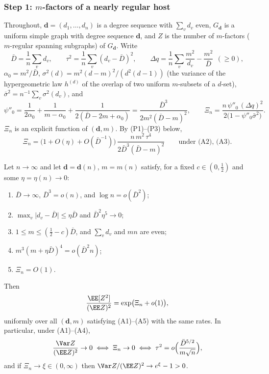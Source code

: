 
\subsubsection*{Step 1: \(m\)-factors of a nearly regular host}

Throughout, \(\mathbf d=(d_1,\dots,d_n)\) is a degree sequence with
\(\sum_vd_v\) even, \(G_{\mathbf d}\) is a uniform simple graph with degree
sequence \(\mathbf d\), and \(Z\) is the number of \(m\)-factors
(\(m\)-regular spanning subgraphs) of \(G_{\mathbf d}\). Write
\[
\bar D=\frac1n\sum_vd_v,\qquad
\tau^2=\frac1n\sum_v(d_v-\bar D)^2,\qquad
\Delta q=\frac1n\sum_v\frac{m^2}{d_v}-\frac{m^2}{\bar D}\ \ (\ge0),
\]
\(\alpha_0=m^2/\bar D\), \(\sigma^2(d)=m^2(d-m)^2/(d^2(d-1))\) (the variance of
the hypergeometric law \(h^{(d)}\) of the overlap of two uniform \(m\)-subsets of
a \(d\)-set), \(\bar\sigma^2=n^{-1}\sum_v\sigma^2(d_v)\), and
\[
\psi''_0=\frac1{2\alpha_0}+\frac1{m-\alpha_0}+\frac1{2(\bar D-2m+\alpha_0)}
=\frac{\bar D^3}{2m^2(\bar D-m)^2},
\qquad
\Xi_n=\frac{n\,\psi''_0\,(\Delta q)^2}{2\bigl(1-\psi''_0\bar\sigma^2\bigr)} .
\]
\(\Xi_n\) is an explicit function of \((\mathbf d,m)\). By (P1)--(P3) below,
\[
\Xi_n=\bigl(1+O(\eta)+O(\bar D^{-1})\bigr)\,
\frac{n\,m^2\,\tau^4}{2\bar D^3(\bar D-m)^2}
\qquad\text{under (A2), (A3).}
\tag{S1.1}
\]

\begin{lemma}
\label{lem:near-regular-host}
Let \(n\to\infty\) and let \(\mathbf d=\mathbf d(n)\), \(m=m(n)\) satisfy, for a fixed
\(c\in(0,\tfrac12)\) and some \(\eta=\eta(n)\to0\):
\begin{enumerate}
\item[(A1)] \(\bar D\to\infty\), \(\bar D^3=o(n)\), and \(\log n=o(\bar D^2)\);
\item[(A2)] \(\max_v\lvert d_v-\bar D\rvert\le\eta\bar D\) and \(\bar D^2\eta^5\to0\);
\item[(A3)] \(1\le m\le(\tfrac12-c)\bar D\), and \(\sum_vd_v\) and \(mn\) are even;
\item[(A4)] \(m^3(m+\eta\bar D)^4=o(\bar D^2n)\);
\item[(A5)] \(\Xi_n=O(1)\).
\end{enumerate}
Then
\[
\frac{\EE[Z^2]}{(\EE Z)^2}=\exp\bigl(\Xi_n+o(1)\bigr),
\]
uniformly over all \((\mathbf d,m)\) satisfying (A1)--(A5) with the same rates.
In particular, under (A1)--(A4),
\[
\frac{\Var Z}{(\EE Z)^2}\to0
\iff
\Xi_n\to0
\iff
\tau^2=o\Bigl(\frac{\bar D^{5/2}}{m\sqrt n}\Bigr),
\]
and if \(\Xi_n\to\xi\in(0,\infty)\) then \(\Var Z/(\EE Z)^2\to e^{\xi}-1>0\).
\end{lemma}

